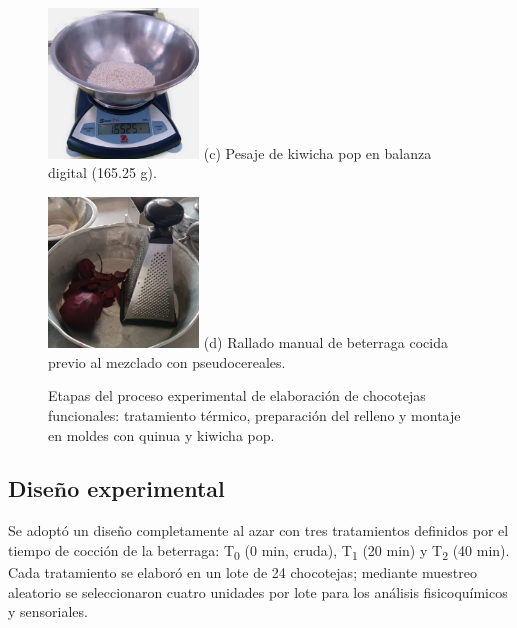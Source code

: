 \documentclass[manuscript,screen,review]{acmart}
\begin{document}
\begin{figure}[H]
          \\[2ex]
          \begin{minipage}{0.24\linewidth}
            \centering
            \includegraphics[width=4cm,height=4cm,keepaspectratio]{imagen/procedimiento/quiwicha.jpeg}
            \small (c) Pesaje de kiwicha pop en balanza digital (165.25 g).
          \end{minipage}
          \hspace{2em}
          \begin{minipage}{0.24\linewidth}
            \centering
            \includegraphics[width=4cm,height=4cm,keepaspectratio]{imagen/procedimiento/rayado.jpeg}
            \small (d) Rallado manual de beterraga cocida previo al mezclado con pseudocereales.
          \end{minipage}
          \caption{Etapas del proceso experimental de elaboración de chocotejas funcionales: tratamiento térmico, preparación del relleno y montaje en moldes con quinua y kiwicha pop.}
          \label{fig:proceso_chocotejas}
        \end{figure}
        

           
    \subsection{Diseño experimental}
    Se adoptó un diseño completamente al azar con tres tratamientos definidos por el tiempo de cocción de la beterraga:  
    T\textsubscript{0} (0 min, cruda),  
    T\textsubscript{1} (20 min) y  
    T\textsubscript{2} (40 min).  
    Cada tratamiento se elaboró en un lote de 24 chocotejas; mediante muestreo aleatorio se seleccionaron cuatro unidades por lote para los an\'alisis fisicoquímicos y sensoriales.
    
\end{document}
